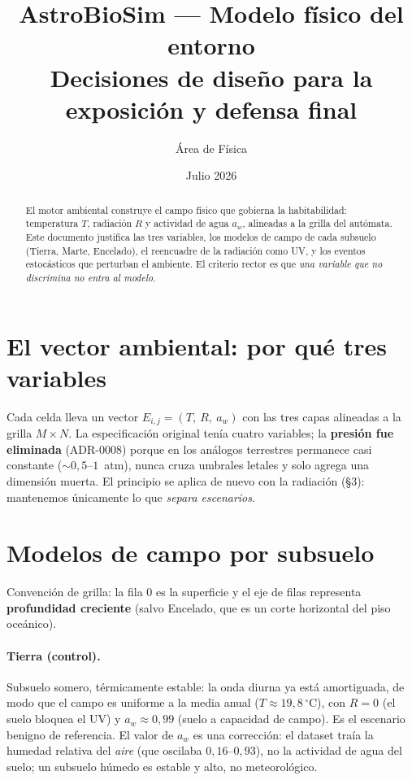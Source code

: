 \documentclass[11pt]{article}
\title{\textbf{AstroBioSim — Modelo físico del entorno}\\[2pt]
\large Decisiones de diseño para la exposición y defensa final}
\author{Área de Física}
\date{Julio 2026}
\newcommand{\campo}{E}
\begin{document}
\maketitle

\begin{abstract}
\noindent El motor ambiental construye el campo físico que gobierna la
habitabilidad: temperatura $T$, radiación $R$ y actividad de agua $a_w$, alineadas
a la grilla del autómata. Este documento justifica las tres variables, los modelos
de campo de cada subsuelo (Tierra, Marte, Encelado), el reencuadre de la radiación
como UV, y los eventos estocásticos que perturban el ambiente. El criterio rector
es que \emph{una variable que no discrimina no entra al modelo}.
\end{abstract}

\section{El vector ambiental: por qué tres variables}

Cada celda lleva un vector $\campo_{i,j}=(T,\ R,\ a_w)$ con las tres capas alineadas
a la grilla $M\times N$. La especificación original tenía cuatro variables; la
\textbf{presión fue eliminada} (ADR-0008) porque en los análogos terrestres
permanece casi constante ($\sim 0{,}5$--$1$~atm), nunca cruza umbrales letales y
solo agrega una dimensión muerta. El principio se aplica de nuevo con la radiación
(§3): mantenemos únicamente lo que \emph{separa escenarios}.

\section{Modelos de campo por subsuelo}

Convención de grilla: la fila $0$ es la superficie y el eje de filas representa
\textbf{profundidad creciente} (salvo Encelado, que es un corte horizontal del
piso oceánico).

\paragraph{Tierra (control).} Subsuelo somero, térmicamente estable: la onda diurna
ya está amortiguada, de modo que el campo es uniforme a la media anual
($T\approx 19{,}8\,^\circ$C), con $R=0$ (el suelo bloquea el UV) y $a_w\approx
0{,}99$ (suelo a capacidad de campo). Es el escenario benigno de referencia. El
valor de $a_w$ es una corrección: el dataset traía la humedad relativa del
\emph{aire} (que oscilaba $0{,}16$--$0{,}93$), no la actividad de agua del suelo;
un subsuelo húmedo es estable y alto, no meteorológico.
\end{document}
